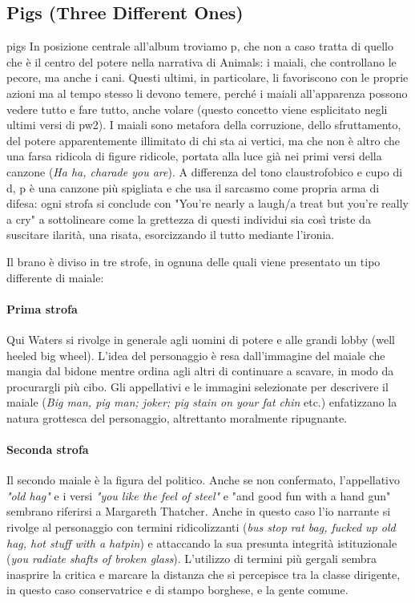 \documentclass[class=book, crop=false, oneside, 12pt]{standalone}
\begin{document}
    \subsection{Pigs (Three Different Ones)}pigs
    In posizione centrale all'album troviamo \acrfull{p}, che non a caso tratta di quello che è il centro del potere nella narrativa di Animals: i maiali, che controllano le pecore, ma anche i cani. Questi ultimi, in particolare, li favoriscono con le proprie azioni ma al tempo stesso li devono temere, perché i maiali all'apparenza possono vedere tutto e fare tutto, anche volare (questo concetto viene esplicitato negli ultimi versi di \acrshort{pw2}). I maiali sono metafora della corruzione, dello sfruttamento, del potere apparentemente illimitato di chi sta ai vertici, ma che non è altro che una farsa ridicola di figure ridicole, portata alla luce già nei primi versi della canzone (\emph{Ha ha, charade you are}). A differenza del tono claustrofobico e cupo di \acrshort{d}, \acrshort{p} è una canzone più spigliata e che usa il sarcasmo come propria arma di difesa: ogni strofa si conclude con "You're nearly a laugh/a treat but you're really a cry" a sottolineare come la grettezza di questi individui sia così triste da suscitare ilarità, una risata, esorcizzando il tutto mediante l'ironia. 
    
    Il brano è diviso in tre strofe, in ognuna delle quali viene presentato un tipo differente di maiale:

    \paragraph{Prima strofa} Qui Waters si rivolge in generale agli uomini di potere e alle grandi lobby (well heeled big wheel). L'idea del personaggio è resa dall'immagine del maiale che mangia dal bidone mentre ordina agli altri di continuare a scavare, in modo da procurargli più cibo. Gli appellativi e le immagini selezionate per descrivere il maiale (\emph{Big man, pig man; joker; pig stain on your fat chin} etc.) enfatizzano la natura grottesca del personaggio, altrettanto moralmente ripugnante.

    \paragraph{Seconda strofa} Il secondo maiale è la figura del politico. Anche se non confermato, l'appellativo \emph{"old hag"} e i versi \emph{"you like the feel of steel"} e "and good fun with a hand gun" sembrano riferirsi a Margareth Thatcher. Anche in questo caso l'io narrante si rivolge al personaggio con termini ridicolizzanti (\emph{bus stop rat bag, fucked up old hag, hot stuff with a hatpin}) e attaccando la sua presunta integrità istituzionale (\emph{you radiate shafts of broken glass}). L'utilizzo di termini più gergali sembra inasprire la critica e marcare la distanza che si percepisce tra la classe dirigente, in questo caso conservatrice e di stampo borghese, e la gente comune.
\end{document}
